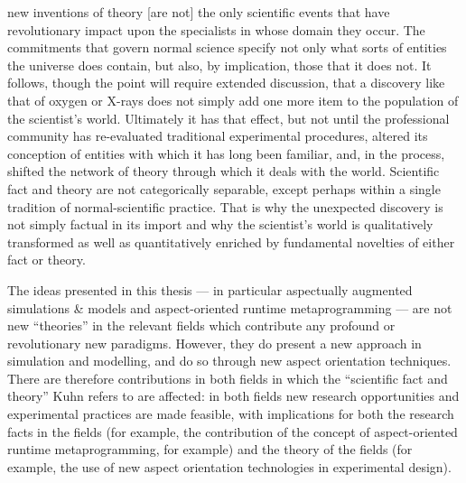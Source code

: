 \begin{displayquote}
   [\ldots{}] new inventions of theory [are not] the only scientific events that have
   revolutionary impact upon the specialists in whose domain they occur. The
   commitments that govern normal science specify not only what sorts of
   entities the universe does contain, but also, by implication, those that it
   does not. It follows, though the point will require extended discussion, that
   a discovery like that of oxygen or X-rays does not simply add one more item
   to the population of the scientist's world. Ultimately it has that effect,
   but not until the professional community has re-evaluated traditional
   experimental procedures, altered its conception of entities with which it has
   long been familiar, and, in the process, shifted the network of theory
   through which it deals with the world. Scientific fact and theory are not
   categorically separable, except perhaps within a single tradition of
   normal-scientific practice. That is why the unexpected discovery is not
   simply factual in its import and why the scientist's world is qualitatively
   transformed as well as quantitatively enriched by fundamental novelties of
   either fact or theory. 
\end{displayquote}

The ideas presented in this thesis --- in particular aspectually augmented
simulations \& models and aspect-oriented runtime metaprogramming --- are not
new ``theories'' in the relevant fields which contribute any profound or
revolutionary new paradigms. However, they do present a new approach in
simulation and modelling, and do so through new aspect orientation techniques.
There are therefore contributions in both fields in which the ``scientific fact
and theory'' Kuhn refers to are affected: in both fields new research
opportunities and experimental practices are made feasible, with implications
for both the research facts in the fields (for example, the contribution of the
concept of aspect-oriented runtime metaprogramming, for example) and the theory
of the fields (for example, the use of new aspect orientation technologies in
experimental design).

